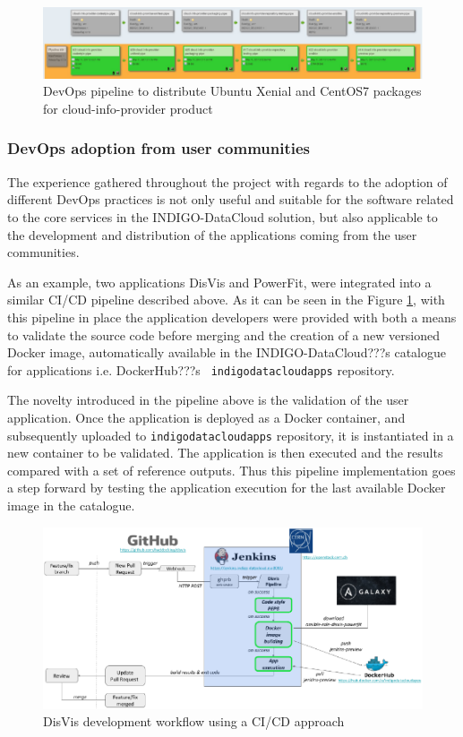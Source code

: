 \documentclass{article}
\begin{document}
\begin{figure}
  \centering
  \includegraphics[width=\textwidth]{./figs/Figure15.pdf}
  \caption{DevOps pipeline to distribute Ubuntu Xenial and CentOS7 packages for cloud-info-provider product}
  \label{fig:15}
\end{figure}

\subsubsection{DevOps adoption from user communities}

The experience gathered throughout the project with regards to the adoption of
different DevOps practices is not only useful and suitable for the software
related to the core services in the INDIGO-DataCloud solution, but also
applicable to the development and distribution of the applications coming from
the user communities.

As an example, two applications DisVis and PowerFit, were integrated into a
similar CI/CD pipeline described above. As it can be seen in the Figure
\ref{fig:15}, with this pipeline in place the application developers were
provided with both a means to validate the source code before merging and the
creation of a new versioned Docker image, automatically available in the
INDIGO-DataCloud???s catalogue for applications i.e. DockerHub???s {\tt
indigodatacloudapps} repository.

The novelty introduced in the pipeline above is the validation of the user
application. Once the application is deployed as a Docker container, and
subsequently uploaded to {\tt indigodatacloudapps} repository, it is
instantiated in a new container to be validated. The application is then
executed and the results compared with a set of reference outputs. Thus this
pipeline implementation goes a step forward by testing the application
execution for the last available Docker image in the catalogue.

\begin{figure}
  \centering
  \includegraphics[width=\textwidth]{./figs/Figure16.pdf}
  \caption{DisVis development workflow using a CI/CD approach}
  \label{fig:16}
\end{figure}
\end{document}
